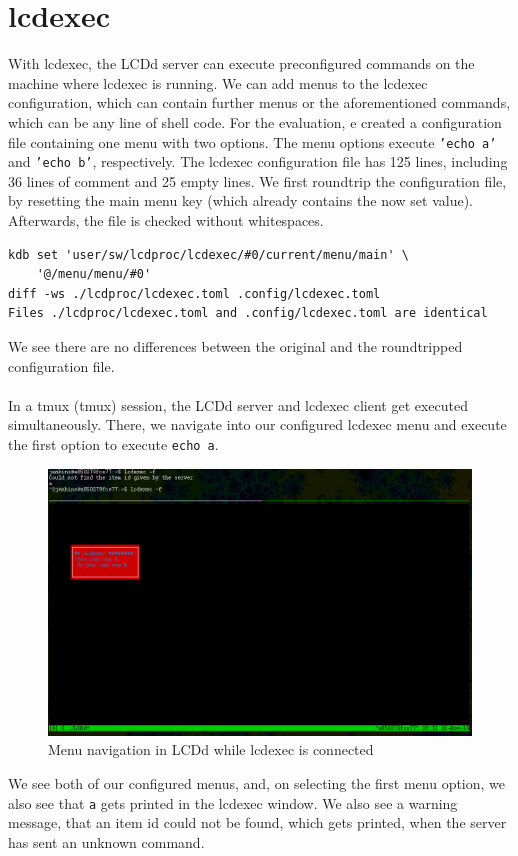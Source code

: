 \documentclass[12pt]{report}
\begin{document}
\section{lcdexec}
With lcdexec, the LCDd server can execute preconfigured commands on the machine where lcdexec is running.
We can add menus to the lcdexec configuration, which can contain further menus or the aforementioned commands, which can be any line of shell code.
For the evaluation, e created a configuration file containing one menu with two options.
The menu options execute \texttt{'echo a'} and \texttt{'echo b'}, respectively.
The lcdexec configuration file has 125 lines, including 36 lines of comment and 25 empty lines.
We first roundtrip the configuration file, by resetting the main menu key (which already contains the now set value).
Afterwards, the file is checked without whitespaces.
{\small
\begin{verbatim}
kdb set 'user/sw/lcdproc/lcdexec/#0/current/menu/main' \
	'@/menu/menu/#0'
diff -ws ./lcdproc/lcdexec.toml .config/lcdexec.toml 
Files ./lcdproc/lcdexec.toml and .config/lcdexec.toml are identical
\end{verbatim}
}
We see there are no differences between the original and the roundtripped configuration file.
\\\\
In a \acrshort{tmux} (\acrlong{tmux}) session, the LCDd server and lcdexec client get executed simultaneously.
There, we navigate into our configured lcdexec menu and execute the first option to execute \texttt{echo a}.
\FloatBarrier
\begin{figure}[h!]
	\centering
		\includegraphics[width=\linewidth]{lcdexec_menu.png}
  \caption{Menu navigation in LCDd while lcdexec is connected}
\label{fig:lcdexec}
\end{figure}
\FloatBarrier
We see both of our configured menus, and, on selecting the first menu option, we also see that \texttt{a} gets printed in the lcdexec window.
We also see a warning message, that an item id could not be found, which gets printed, when the server has sent an unknown command.
\end{document}
